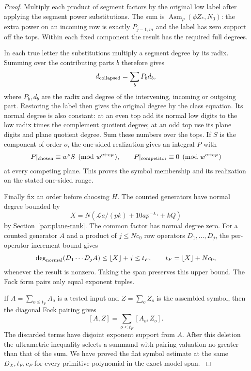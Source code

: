 \begin{proof}
Multiply each product of segment factors by the original low
label after applying the segment power substitutions. The sum
is \(\operatorname{Asm}_\rho(\phi Z_*,N_0)\): the extra power
on an incoming row is exactly \(P_{j-1,m}\) and the label has
zero support off the tops. Within each fixed component the
result has the required full degrees.

In each true letter the substitutions multiply a segment degree by its radix. Summing over the contributing parts \(b\) therefore gives 
\[
 d_{\rm collapsed}=\sum_b P_b d_b,
\]
 where \(P_b,d_b\) are the radix and degree of the intervening, incoming or outgoing part. Restoring the label then gives the original degree
by the class equation. Its normal degree is also constant: at
an even top add its normal low digits to the low radix times the
complement quotient degree; at an odd top use its plane digits
and plane quotient degree. Sum these numbers over the tops.
If \(S\) is the component of order \(o\), the one-sided realization gives an integral \(P\) with
\[
 P|_{\rm chosen}\equiv w^o S\pmod{w^{o+c_P}},\qquad P|_{\rm competitor}\equiv0\pmod{w^{o+c_P}}
\]
at every competing plane. This proves the symbol membership and its realization on the stated one-sided range.

Finally fix an order before choosing \(H\). The counted generators
have normal degree bounded by
\[
 X=N(\mathcal L a/(pk)+10a p^{-L_1}+kQ)
\]
by
Section~\ref{par:plane-rank}. The common factor has normal degree zero. For a counted generator \(A\) and a product of \(j\le Nc_0\) row operators \(D_1,\ldots,D_j\), the per-operator increment bound gives
\[
 \deg_{\rm normal}(D_1\cdots D_j A)
     \le \lfloor X\rfloor+j\le t_F,\qquad t_F=\lfloor X\rfloor+Nc_0,
\]
whenever the result is nonzero. Taking the span preserves this upper bound. The Fock form pairs only equal exponent tuples.

If \(A=\sum_{o\le t_F}A_o\) is a tested input and
\(Z=\sum_o Z_o\) is the assembled symbol, then the diagonal
Fock pairing gives
\[
                  [A,Z]=\sum_{o\le t_F}[A_o,Z_o] .
\]
The discarded terms have disjoint exponent support from \(A\).
After this deletion the ultrametric inequality selects a
summand with pairing valuation no greater than that of the sum. We have proved the flat symbol estimate
at the same \(D_X,t_F,c_P\) for every primitive polynomial in
the exact model span. \label{cor:plane-return-1}
\end{proof}
